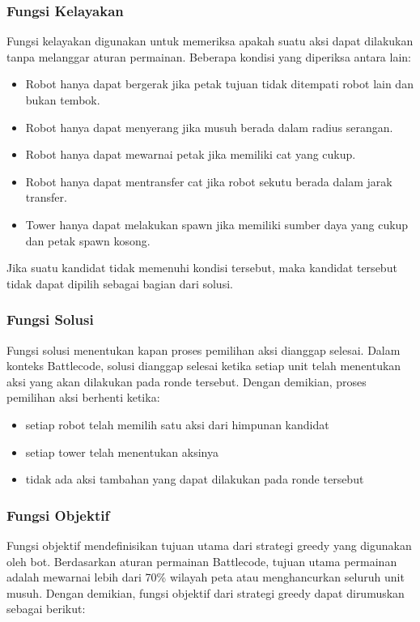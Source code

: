 \documentclass{article}
\begin{document}
\subsubsection{Fungsi Kelayakan}

Fungsi kelayakan digunakan untuk memeriksa apakah suatu aksi dapat dilakukan tanpa melanggar aturan permainan. Beberapa kondisi yang diperiksa antara lain:

\begin{itemize}
\item Robot hanya dapat bergerak jika petak tujuan tidak ditempati robot lain dan bukan tembok.
\item Robot hanya dapat menyerang jika musuh berada dalam radius serangan.
\item Robot hanya dapat mewarnai petak jika memiliki cat yang cukup.
\item Robot hanya dapat mentransfer cat jika robot sekutu berada dalam jarak transfer.
\item Tower hanya dapat melakukan spawn jika memiliki sumber daya yang cukup dan petak spawn kosong.
\end{itemize}

Jika suatu kandidat tidak memenuhi kondisi tersebut, maka kandidat tersebut tidak dapat dipilih sebagai bagian dari solusi.

\subsubsection{Fungsi Solusi}

Fungsi solusi menentukan kapan proses pemilihan aksi dianggap selesai. Dalam konteks Battlecode, solusi dianggap selesai ketika setiap unit telah menentukan aksi yang akan dilakukan pada ronde tersebut.
Dengan demikian, proses pemilihan aksi berhenti ketika:

\begin{itemize}
\item setiap robot telah memilih satu aksi dari himpunan kandidat
\item setiap tower telah menentukan aksinya
\item tidak ada aksi tambahan yang dapat dilakukan pada ronde tersebut
\end{itemize}

\subsubsection{Fungsi Objektif}

Fungsi objektif mendefinisikan tujuan utama dari strategi greedy yang digunakan oleh bot. Berdasarkan aturan permainan Battlecode, tujuan utama permainan adalah mewarnai lebih dari 70\% wilayah peta atau menghancurkan seluruh unit musuh.
Dengan demikian, fungsi objektif dari strategi greedy dapat dirumuskan sebagai berikut:
\end{document}
